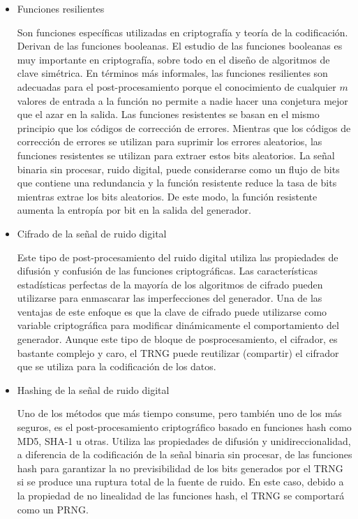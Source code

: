 \begin{itemize}
		\item Funciones resilientes
		
		Son funciones específicas utilizadas en criptografía y teoría de la codificación. Derivan de las funciones booleanas. El estudio de las funciones booleanas es muy importante en criptografía, sobre todo en el diseño de algoritmos de clave simétrica.  En términos más informales, las funciones resilientes son adecuadas para el post-procesamiento porque el conocimiento de cualquier $m$ valores de entrada a la función no permite a nadie hacer una conjetura mejor que el azar en la salida. Las funciones resistentes se basan en el mismo principio que los códigos de corrección de errores. Mientras que los códigos de corrección de errores se utilizan para suprimir los errores aleatorios, las funciones resistentes se utilizan para extraer estos bits aleatorios. La señal binaria sin procesar, ruido digital, puede considerarse como un flujo de bits que contiene una redundancia y la función resistente reduce la tasa de bits mientras extrae los bits aleatorios. De este modo, la función resistente aumenta la entropía por bit en la salida del generador.
			
		\item Cifrado de la señal de ruido digital
		
		Este tipo de post-procesamiento del ruido digital utiliza las propiedades de difusión y confusión de las funciones criptográficas. Las características estadísticas perfectas de la mayoría de los algoritmos de cifrado pueden utilizarse para enmascarar las imperfecciones del generador. Una de las ventajas de este enfoque es que la clave de cifrado puede utilizarse como variable criptográfica para modificar dinámicamente el comportamiento del generador. Aunque este tipo de bloque de posprocesamiento, el cifrador, es bastante complejo y caro, el TRNG puede reutilizar (compartir) el cifrador que se utiliza para la codificación de los datos.	
		
		
		\item Hashing de la señal de ruido digital
		
		Uno de los métodos que más tiempo consume, pero también uno de los más seguros, es el post-procesamiento criptográfico basado en funciones hash como MD5, SHA-1 u otras. Utiliza las propiedades de difusión y unidireccionalidad, a diferencia de la codificación de la señal binaria sin procesar, de las funciones hash para garantizar la no previsibilidad de los bits generados por el TRNG si se produce una ruptura total de la fuente de ruido. En este caso, debido a la propiedad de no linealidad de las funciones hash, el TRNG se comportará como un PRNG.
	\end{itemize}
	
